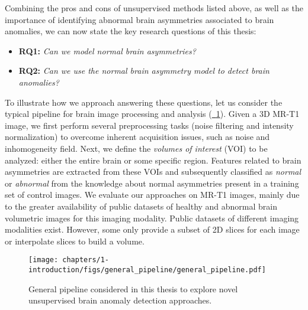 Combining the pros and cons of unsupervised methods listed above, as well as the importance of identifying abnormal brain asymmetries associated to brain anomalies, we can now state the key research questions of this thesis:


\begin{itemize}[leftmargin=*]
    \item[]\textbf{RQ1:} \emph{Can we model normal brain asymmetries?}
    \item[]\textbf{RQ2:} \emph{Can we use the normal brain asymmetry model to detect brain anomalies?}
\end{itemize}


To illustrate how we approach answering these questions, let us consider the typical pipeline for brain image processing and analysis (\hyperref[fig:general_pipeline]{\fig~\ref{fig:general_pipeline}}). Given a 3D MR-T1 image, we first perform several preprocessing tasks (\eg noise filtering and intensity normalization) to overcome inherent acquisition issues, such as noise and inhomogeneity field. Next, we define the \emph{volumes of interest} (VOI) to be analyzed: either the entire brain or some specific region. Features related to brain asymmetries are extracted from these VOIs and subsequently classified as \emph{normal} or \emph{abnormal} from the knowledge about normal asymmetries present in a training set of control images. We evaluate our approaches on MR-T1 images, mainly due to the greater availability of public datasets of healthy and abnormal brain volumetric images for this imaging modality. Public datasets of different imaging modalities exist. However, some only provide a subset of 2D slices for each image or interpolate slices to build a volume.


\begin{figure}[!ht]
    \centering
    \texttt{[image: chapters/1-introduction/figs/general\_pipeline/general\_pipeline.pdf]}
    \caption[General pipeline for unsupervised brain anomaly detection.]{General pipeline considered in this thesis to explore novel unsupervised brain anomaly detection approaches.
    }
    \label{fig:general_pipeline}
\end{figure}


